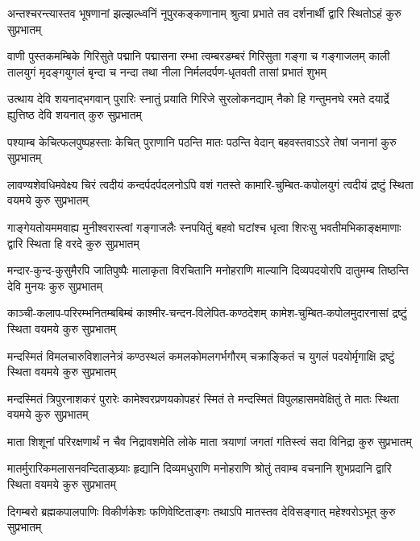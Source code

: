 \fourlineindentedshloka
{अन्तश्चरन्त्यास्तव भूषणानां}
{झल्झल्ध्वनिं नूपुरकङ्कणानाम्}
{श्रुत्वा प्रभाते तव दर्शनार्थी}
{द्वारि स्थितोऽहं कुरु सुप्रभातम्}

\fourlineindentedshloka
{वाणी पुस्तकमम्बिके गिरिसुते पद्मानि पद्मासना}
{रम्भा त्वम्बरडम्बरं गिरिसुता गङ्गा च गङ्गाजलम्}
{काली तालयुगं मृदङ्गयुगलं बृन्दा च नन्दा तथा}
{नीला निर्मलदर्पण-धृतवती तासां प्रभातं शुभम्}

\fourlineindentedshloka
{उत्थाय देवि शयनाद्भगवान् पुरारिः}
{स्नातुं प्रयाति गिरिजे सुरलोकनद्याम्}
{नैको हि गन्तुमनघे रमते दयार्द्रे}
{ह्युत्तिष्ठ देवि शयनात् कुरु सुप्रभातम्}

\fourlineindentedshloka
{पश्याम्ब केचित्फलपुष्पहस्ताः}
{केचित् पुराणानि पठन्ति मातः}
{पठन्ति वेदान् बहवस्तवाऽऽरे}
{तेषां जनानां कुरु सुप्रभातम्}

\fourlineindentedshloka
{लावण्यशेवधिमवेक्ष्य चिरं त्वदीयं}
{कन्दर्पदर्पदलनोऽपि वशं गतस्ते}
{कामारि-चुम्बित-कपोलयुगं त्वदीयं}
{द्रष्टुं स्थिता वयमये कुरु सुप्रभातम्}

\fourlineindentedshloka
{गाङ्गेयतोयममवाह्य मुनीश्वरास्त्वां}
{गङ्गाजलैः स्नपयितुं बहवो घटांश्च}
{धृत्वा शिरःसु भवतीमभिकाङ्क्षमाणाः}
{द्वारि स्थिता हि वरदे कुरु सुप्रभातम्}

\fourlineindentedshloka
{मन्दार-कुन्द-कुसुमैरपि जातिपुष्पैः}
{मालाकृता विरचितानि मनोहराणि}
{माल्यानि दिव्यपदयोरपि दातुमम्ब}
{तिष्ठन्ति देवि मुनयः कुरु सुप्रभातम्}

\fourlineindentedshloka
{काञ्ची-कलाप-परिरम्भनितम्बबिम्बं}
{काश्मीर-चन्दन-विलेपित-कण्ठदेशम्}
{कामेश-चुम्बित-कपोलमुदारनासां}
{द्रष्टुं स्थिता वयमये कुरु सुप्रभातम्}

\fourlineindentedshloka
{मन्दस्मितं विमलचारुविशालनेत्रं}
{कण्ठस्थलं कमलकोमलगर्भगौरम्}
{चक्राङ्कितं च युगलं पदयोर्मृगाक्षि}
{द्रष्टुं स्थिता वयमये कुरु सुप्रभातम्}

\fourlineindentedshloka
{मन्दस्मितं त्रिपुरनाशकरं पुरारेः}
{कामेश्वरप्रणयकोपहरं स्मितं ते}
{मन्दस्मितं विपुलहासमवेक्षितुं ते}
{मातः स्थिता वयमये कुरु सुप्रभातम्}

\fourlineindentedshloka
{माता शिशूनां परिरक्षणार्थं}
{न चैव निद्रावशमेति लोके}
{माता त्रयाणां जगतां गतिस्त्वं}
{सदा विनिद्रा कुरु सुप्रभातम्}

\fourlineindentedshloka
{मातर्मुरारिकमलासनवन्दिताङ्घ्र्याः}
{हृद्यानि दिव्यमधुराणि मनोहराणि}
{श्रोतुं तवाम्ब वचनानि शुभप्रदानि}
{द्वारि स्थिता वयमये कुरु सुप्रभातम्}

\fourlineindentedshloka
{दिगम्बरो ब्रह्मकपालपाणिः}
{विकीर्णकेशः फणिवेष्टिताङ्गः}
{तथाऽपि मातस्तव देविसङ्गात्}
{महेश्वरोऽभूत् कुरु सुप्रभातम्}

